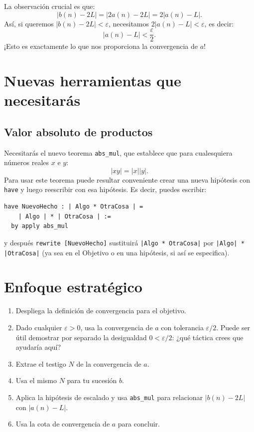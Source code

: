 La observación crucial es que:
\[
  |b(n) - 2L| = |2a(n) - 2L| = 2|a(n) - L|.
\]
Así, si queremos $|b(n) - 2L| < \varepsilon$, necesitamos
$2|a(n) - L| < \varepsilon$, es decir:
\[
  |a(n) - L| < \frac{\varepsilon}{2}.
\]
¡Esto es exactamente lo que nos proporciona la convergencia de $a$!

\section{Nuevas herramientas que necesitarás}

\subsection{Valor absoluto de productos}

Necesitarás el nuevo teorema \texttt{abs\_mul}, que establece que para
cualesquiera números reales $x$ e $y$:
\[
  |xy| = |x||y|.
\]
Para usar este teorema puede resultar conveniente crear una nueva hipótesis
con \texttt{have} y luego reescribir con esa hipótesis. Es decir, puedes
escribir:

\begin{verbatim}
have NuevoHecho : | Algo * OtraCosa | =
    | Algo | * | OtraCosa | :=
  by apply abs_mul
\end{verbatim}

y después \texttt{rewrite [NuevoHecho]} sustituirá
\texttt{|Algo * OtraCosa|} por
\texttt{|Algo| * |OtraCosa|} (ya sea en el Objetivo o en una
hipótesis, si así se especifica).

\section{Enfoque estratégico}

\begin{enumerate}
  \item Despliega la definición de convergencia para el objetivo.
  \item Dado cualquier $\varepsilon > 0$, usa la convergencia de $a$ con
        tolerancia $\varepsilon/2$. Puede ser útil demostrar por separado la
        desigualdad $0 < \varepsilon/2$: ¿qué táctica crees que ayudaría aquí?
  \item Extrae el testigo $N$ de la convergencia de $a$.
  \item Usa el mismo $N$ para tu sucesión $b$.
  \item Aplica la hipótesis de escalado y usa \texttt{abs\_mul} para relacionar
        $|b(n) - 2L|$ con $|a(n) - L|$.
  \item Usa la cota de convergencia de $a$ para concluir.
\end{enumerate}

